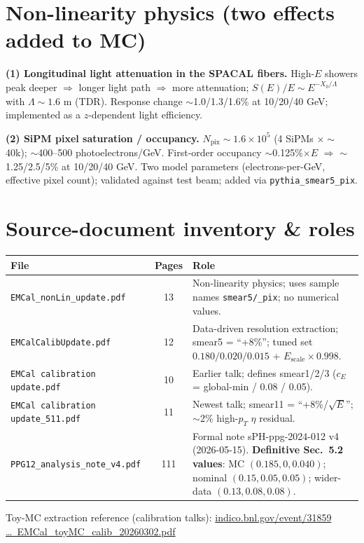 \documentclass[11pt]{article}
\begin{document}
\section{Non-linearity physics (two effects added to MC)}
\textbf{(1) Longitudinal light attenuation in the SPACAL fibers.}
High-$E$ showers peak deeper $\Rightarrow$ longer light path $\Rightarrow$ more
attenuation; $S(E)/E \sim E^{-X_0/\Lambda}$ with $\Lambda\!\sim\!1.6$ m (TDR).
Response change $\sim$1.0/1.3/1.6\% at 10/20/40 GeV; implemented as a $z$-dependent
light efficiency.

\textbf{(2) SiPM pixel saturation / occupancy.}
$N_{\text{pix}}\!\sim\!1.6\times10^5$ (4 SiPMs $\times\sim$40k); $\sim$400--500
photoelectrons/GeV. First-order occupancy $\sim$0.125\%$\times E$ $\Rightarrow$
$\sim$1.25/2.5/5\% at 10/20/40 GeV. Two model parameters (electrons-per-GeV,
effective pixel count); validated against test beam; added via
\texttt{pythia\_smear5\_pix}.

\section{Source-document inventory \& roles}
\begin{center}
\renewcommand{\arraystretch}{1.2}
\begin{tabular}{l c p{8.2cm}}
\toprule
\textbf{File} & \textbf{Pages} & \textbf{Role} \\
\midrule
\texttt{EMCal\_nonLin\_update.pdf} & 13 & Non-linearity physics; uses sample names \texttt{smear5/\_pix}; no numerical values. \\
\texttt{EMCalCalibUpdate.pdf} & 12 & Data-driven resolution extraction; smear5 = ``+8\%''; tuned set $0.180/0.020/0.015$ + $E_{\text{scale}}\times0.998$. \\
\texttt{EMCal calibration update.pdf} & 10 & Earlier talk; defines smear1/2/3 ($c_E$ = global-min / 0.08 / 0.05). \\
\texttt{EMCal calibration update\_511.pdf} & 11 & Newest talk; smear11 = ``+8\%/$\sqrt{E}$''; $\sim$2\% high-$p_T$ $\eta$ residual. \\
\texttt{PPG12\_analysis\_note\_v4.pdf} & 111 & Formal note sPH-ppg-2024-012 v4 (2026-05-15). \textbf{Definitive Sec.~5.2 values}: MC $(0.185,0,0.040)$; nominal $(0.15,0.05,0.05)$; wider-data $(0.13,0.08,0.08)$. \\
\bottomrule
\end{tabular}
\end{center}
Toy-MC extraction reference (calibration talks):
\href{https://indico.bnl.gov/event/31859/contributions/120756/attachments/68548/117758/EMCal_toyMC_calib_20260302.pdf}{indico.bnl.gov/event/31859 \dots\ EMCal\_toyMC\_calib\_20260302.pdf}
\end{document}
